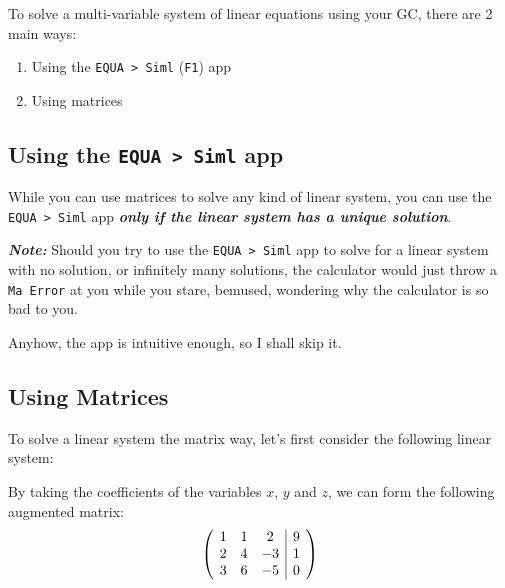 \documentclass[a5paper,draft]{memoir}
\makeatletter
\newenvironment{amatrix}[1]{%
		\left(\hspace{0.15cm}\begin{array}{@{}*{#1}{c}|c@{}}
		}{%
	\end{array}\hspace{0.15cm}\right)
	}
\def\code#1{\texttt{#1}}
\def\note#1{\textbf{\textit{Note:}} #1}
\def\Fone{(\code{F1}) }
\makeatother
\begin{document}
To solve a multi-variable system of linear equations using your GC, there are 2 main ways:
\begin{enumerate}
	\item Using the \code{EQUA > Siml} \Fone app
	\item Using matrices
\end{enumerate}

\subsection{Using the \code{EQUA > Siml} app}
While you can use matrices to solve any kind of linear system, you can use the \code{EQUA > Siml} app \textit{\textbf{only if the linear system has a unique solution}}.

\note{Should you try to use the \code{EQUA > Siml} app to solve for a linear system with no solution, or infinitely many solutions, the calculator would just throw a \code{Ma Error} at you while you stare, bemused, wondering why the calculator is so bad to you.}

Anyhow, the app is intuitive enough, so I shall skip it.

\subsection{Using Matrices}

To solve a linear system the matrix way, let's first consider the following linear system:
\begin{center}
\end{center}

By taking the coefficients of the variables $x$, $y$ and $z$, we can form the following augmented matrix:
\[
	\begin{amatrix}{3}
		1 & 1 & 2  & 9 \\  
		2 & 4 & -3 & 1 \\
		3 & 6 & -5 & 0
	\end{amatrix}
\]
\end{document}
